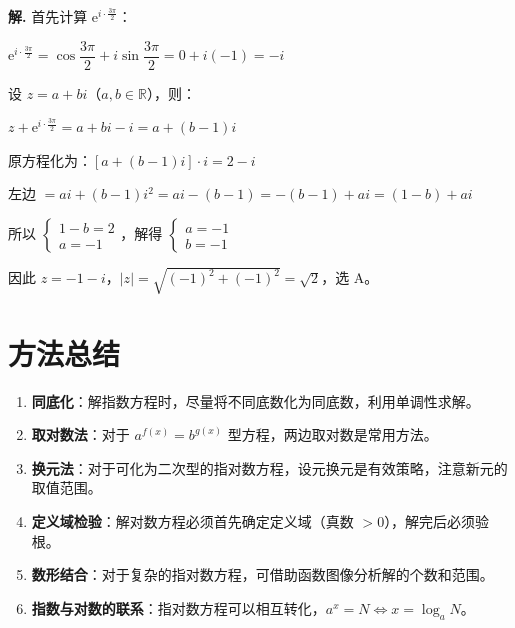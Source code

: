\documentclass[11pt]{ctexrep}
\begin{document}
\textbf{解.} 首先计算 $\mathrm{e}^{i \cdot \frac{3\pi}{2}}$：

$\mathrm{e}^{i \cdot \frac{3\pi}{2}} = \cos\dfrac{3\pi}{2} + i\sin\dfrac{3\pi}{2} = 0 + i(-1) = -i$

设 $z = a + bi$（$a, b \in \mathbb{R}$），则：

$z + \mathrm{e}^{i \cdot \frac{3\pi}{2}} = a + bi - i = a + (b-1)i$

原方程化为：$[a + (b-1)i] \cdot i = 2 - i$

左边 $= ai + (b-1)i^2 = ai - (b-1) = -(b-1) + ai = (1-b) + ai$

所以 $\begin{cases} 1 - b = 2 \\ a = -1 \end{cases}$，解得 $\begin{cases} a = -1 \\ b = -1 \end{cases}$

因此 $z = -1 - i$，$|z| = \sqrt{(-1)^2 + (-1)^2} = \sqrt{2}$，选 A。

\section*{方法总结}

\begin{enumerate}
    \item \textbf{同底化}：解指数方程时，尽量将不同底数化为同底数，利用单调性求解。
    \item \textbf{取对数法}：对于 $a^{f(x)} = b^{g(x)}$ 型方程，两边取对数是常用方法。
    \item \textbf{换元法}：对于可化为二次型的指对数方程，设元换元是有效策略，注意新元的取值范围。
    \item \textbf{定义域检验}：解对数方程必须首先确定定义域（真数 $> 0$），解完后必须验根。
    \item \textbf{数形结合}：对于复杂的指对数方程，可借助函数图像分析解的个数和范围。
    \item \textbf{指数与对数的联系}：指对数方程可以相互转化，$a^x = N \Leftrightarrow x = \log_a N$。
\end{enumerate}
\end{document}

